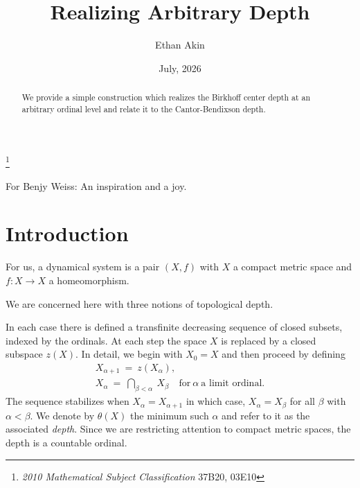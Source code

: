 \documentclass[12pt]{amsart}
\def \a {\alpha }
\def \b {\beta}
\def \th {\theta}
\numberwithin{equation}{section}
\begin{document}
\begin{titlepage}
\large
\title {\bfseries Realizing Arbitrary Depth}
\author{Ethan Akin}
 \vspace{.7cm}

\address{Mathematics Department \\
    The City College \\ 137 Street and Convent Avenue \\
       New York City, NY 10031, USA     }

\date{July, 2026} \vspace{.7cm}


{\footnotesize \begin{abstract}We provide a simple construction which realizes the Birkhoff center depth at an arbitrary ordinal level and relate it
to the Cantor-Bendixson depth.
\end{abstract}}


\thanks{{\em 2010 Mathematical Subject Classification} 37B20, 03E10}


\end{titlepage}
\maketitle

For Benjy Weiss: An inspiration and a joy.\vspace{.7cm}

\setcounter{page}{1}
\section{ \textbf{Introduction}}\label{intro}\vspace{.5cm}

For us, a dynamical system is a pair $(X,f)$ with $X$ a compact metric space and $f : X \to X$ a homeomorphism.


We are concerned here with three notions of topological
depth.

In each case there is defined a transfinite decreasing sequence of closed subsets, indexed by the ordinals. At each step the space $X$ is replaced by
a closed subspace $z(X)$. In detail, we
begin with $X_0 = X$ and then proceed by defining
\begin{equation}\label{eq0.01}\begin{split}
X_{\a + 1} \ = \ z(X_{\a}), \hspace{2cm} \\
X_{\a} \ = \ \bigcap_{\b < \a} \ X_{\b} \quad \text{for} \ \a \ \text{a limit ordinal}.
\end{split}\end{equation}
The sequence stabilizes when $X_{\a} = X_{\a + 1}$ in which case, $X_{\a} = X_{\b}$ for all $\b$ with  $\a < \b$. We denote by $\th(X)$ the
minimum such $\a$ and refer to it as the associated \emph{depth}. Since we are restricting attention to compact metric spaces,
the depth is a countable ordinal.
\end{document}
